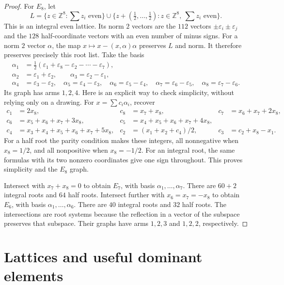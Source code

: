 \begin{proof}
For \(E_8\), let
\[
 L=\{z\in\mathbb Z^8:\textstyle\sum z_i\text{ even}\}
 \cup
 \{z+(\tfrac12,\ldots,\tfrac12):z\in\mathbb Z^8,\
                                      \textstyle\sum z_i\text{ even}\}.
\]
This is an integral even lattice. Its norm \(2\) vectors are
the \(112\) vectors \(\pm\varepsilon_i\pm\varepsilon_j\)
and the \(128\) half-coordinate vectors with an even
number of minus signs. For a norm \(2\) vector \(\alpha\),
the map \(x\mapsto x-(x,\alpha)\alpha\) preserves \(L\)
and norm. It therefore preserves precisely this root list.
Take the basis
\[
\begin{split}
 \alpha_1&=\tfrac12(\varepsilon_1+\varepsilon_8
                         -\varepsilon_2-\cdots-\varepsilon_7),\\
 \alpha_2&=\varepsilon_1+\varepsilon_2,\qquad
 \alpha_3=\varepsilon_2-\varepsilon_1,\\
 \alpha_4&=\varepsilon_3-\varepsilon_2,\quad
 \alpha_5=\varepsilon_4-\varepsilon_3,\quad
 \alpha_6=\varepsilon_5-\varepsilon_4,\quad
 \alpha_7=\varepsilon_6-\varepsilon_5,\quad
 \alpha_8=\varepsilon_7-\varepsilon_6 .
\end{split}
\]
Its graph has arms \(1,2,4\).
Here is an explicit way to check simplicity, without relying
only on a drawing. For \(x=\sum c_i\alpha_i\), recover
\[
\begin{aligned}
c_1&=2x_8,&c_8&=x_7+x_8,&c_7&=x_6+x_7+2x_8,\\
c_6&=x_5+x_6+x_7+3x_8,&
c_5&=x_4+x_5+x_6+x_7+4x_8,\\
c_4&=x_3+x_4+x_5+x_6+x_7+5x_8,&
c_2&=(x_1+x_2+c_4)/2,&c_3&=c_2+x_8-x_1 .
\end{aligned}
\]
For a half root the parity condition makes these integers,
all nonnegative when \(x_8=1/2\), and all nonpositive
when \(x_8=-1/2\). For an integral root, the same formulas
with its two nonzero coordinates give one sign throughout.
This proves simplicity and the \(E_8\) graph.

Intersect with \(x_7+x_8=0\) to obtain \(E_7\),
with basis \(\alpha_1,\ldots,\alpha_7\).
There are \(60+2\) integral roots and \(64\) half roots.
Intersect further with \(x_6=x_7=-x_8\) to obtain \(E_6\),
with basis \(\alpha_1,\ldots,\alpha_6\).
There are \(40\) integral roots and \(32\) half roots.
The intersections are root systems because the reflection
in a vector of the subspace preserves that subspace.
Their graphs have arms \(1,2,3\) and \(1,2,2\), respectively.
\end{proof}

\section{Lattices and useful dominant elements}

